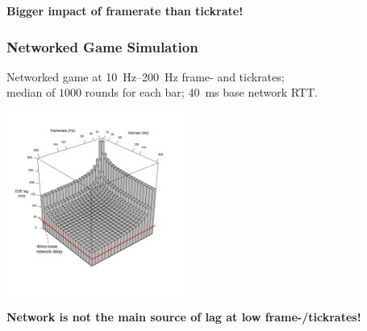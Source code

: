 \documentclass{UDEbeamerEN}
\begin{document}
\begin{frame}
\begin{overprint}
{\begin{center}
				\textbf{Bigger impact of framerate than tickrate!}
			\end{center}}
	\end{overprint}


\end{frame}


\begin{frame}
	\frametitle{Networked Game Simulation}

	\begin{center}
	\vspace{-9mm}
		Networked game at \SIrange{10}{200}{\hertz} frame- and tickrates; \\
		median of $1000$ rounds for each bar; \SI{40}{\milli\second} base network RTT.

		\includegraphics[height=6cm]{extras/e2e-lag-3dbars-annotated.pdf}
		\vspace{-10mm}

		\textbf{Network is not the main source of lag at low frame-/tickrates!}

	\end{center}

\end{frame}
\end{document}
